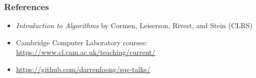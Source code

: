 \documentclass{beamer}
\begin{document}
\begin{frame}
 \frametitle{References}
 \begin{itemize}
  \item \emph{Introduction to Algorithms} by Cormen, Leiserson, Rivest, and Stein (CLRS)
  \item Cambridge Computer Laboratory courses: \url{https://www.cl.cam.ac.uk/teaching/current/}
  \item \url{https://github.com/darrenfoong/sqc-talks/}
 \end{itemize}
\end{frame}
\end{document}
